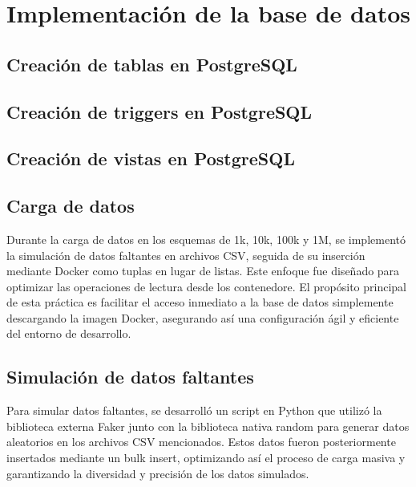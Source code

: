 \section{Implementación de la base de datos}
\subsection{Creación de tablas en PostgreSQL}

\subsection{Creación de triggers en PostgreSQL}

\subsection{Creación de vistas en PostgreSQL}


\subsection{Carga de datos}{Durante la carga de datos en los esquemas de 1k, 10k, 100k y 1M, se implementó la simulación de datos faltantes en archivos CSV, seguida de su inserción mediante Docker como tuplas en lugar de listas. Este enfoque fue diseñado para optimizar las operaciones de lectura desde los contenedore. El propósito principal de esta práctica es facilitar el acceso inmediato a la base de datos simplemente descargando la imagen Docker, asegurando así una configuración ágil y eficiente del entorno de desarrollo.}
\subsection{Simulación de datos faltantes}{Para simular datos faltantes, se desarrolló un script en Python que utilizó la biblioteca externa Faker junto con la biblioteca nativa random para generar datos aleatorios en los archivos CSV mencionados. Estos datos fueron posteriormente insertados mediante un bulk insert, optimizando así el proceso de carga masiva y garantizando la diversidad y precisión de los datos simulados.}